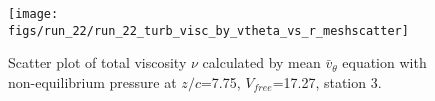 \begin{figure}[H]
\centering
\texttt{[image: figs/run\_22/run\_22\_turb\_visc\_by\_vtheta\_vs\_r\_meshscatter]}
\caption{Scatter plot of total viscosity $\nu$ calculated by mean $\bar{v}_{\theta}$ equation with non-equilibrium pressure at $z/c$=7.75, $V_{free}$=17.27, station 3.}
\label{fig:run_22_turb_visc_by_vtheta_vs_r_meshscatter}
\end{figure}


